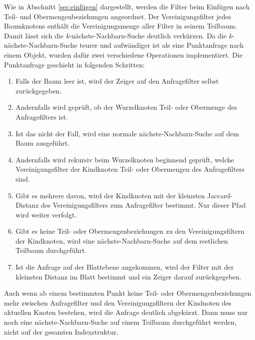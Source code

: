 Wie in Abschnitt \ref{sec:einfügen} dargestellt, werden die Filter beim Einfügen nach Teil- und Obermengenbeziehungen angeordnet. Der Vereinigungsfilter jedes Baumknotens enthält die Vereinigungsmenge aller Filter in seinem Teilbaum. Damit lässt sich die \textit{k}-nächste-Nachbarn-Suche deutlich verkürzen. Da die \textit{k}-nächste-Nachbarn-Suche teurer und aufwändiger ist als eine Punktanfrage nach einem Objekt, wurden dafür zwei verschiedene Operationen implementiert. Die Punktanfrage geschieht in folgenden Schritten: 
\newpage
\begin{enumerate}
\setlength{\itemsep}{20pt}
	\item Falls der Baum leer ist, wird der Zeiger auf den Anfragefilter selbst zurückgegeben. 
	\item Andernfalls wird geprüft, ob der Wurzelknoten Teil- oder Obermenge des Anfragefilters ist. 
	\item Ist das nicht der Fall, wird eine normale nächste-Nachbarn-Suche auf dem Baum ausgeführt. 
	\item Andernfalls wird rekursiv beim Wurzelknoten beginnend geprüft, welche Vereinigungsfilter der Kindknoten Teil- oder Obermengen des Anfragefilters sind. 
	\item Gibt es mehrere davon, wird der Kindknoten mit der kleinsten Jaccard-Distanz des Vereinigungsfilters zum Anfragefilter bestimmt. Nur dieser Pfad wird weiter verfolgt.
	\item Gibt es keine Teil- oder Obermengenbeziehungen zu den Vereinigungsfiltern der Kindknoten, wird eine nächste-Nachbarn-Suche auf dem restlichen Teilbaum durchgeführt. 
	\item Ist die Anfrage auf der Blattebene angekommen, wird der Filter mit der kleinsten Distanz im Blatt bestimmt und ein Zeiger darauf zurückgegeben.  
\end{enumerate}
Auch wenn ab einem bestimmten Punkt keine Teil- oder Obermengenbeziehungen mehr zwischen Anfragefilter und den Vereinigungsfiltern der Kindnoten des aktuellen Knoten bestehen, wird die Anfrage deutlich abgekürzt. Dann muss nur noch eine nächste-Nachbarn-Suche auf einem Teilbaum durchgeführt werden, nicht auf der gesamten Indexstruktur. 

